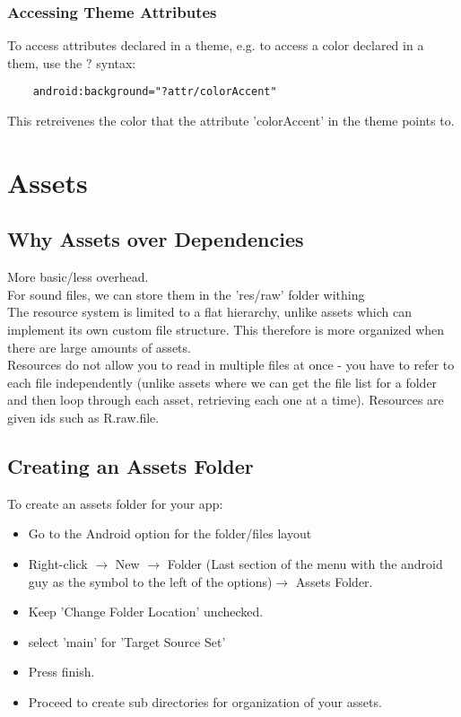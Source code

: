 \documentclass[]{article}
\begin{document}
\subsubsection{Accessing Theme Attributes}
To access attributes declared in a theme, e.g. to access a color declared in a them, use the $ ? $ syntax:
\begin{lstlisting}
	android:background="?attr/colorAccent"
\end{lstlisting}
This retreivenes the color that the attribute 'colorAccent' in the theme points to.

\section{Assets}
\subsection{Why Assets over Dependencies}
More basic/less overhead.
\\
For sound files, we can store them in the 'res/raw' folder withing 
\\
The resource system is limited to a flat hierarchy, unlike assets which can implement its own custom file structure.  This therefore is more organized when there are large amounts of assets.
\\
Resources do not allow you to read in multiple files at once - you have to refer to each file independently (unlike assets where we can get the file list for a folder and then  loop through each asset, retrieving each one at a time).  Resources are given ids such as R.raw.file.


\subsection{Creating an Assets Folder}
To create an assets folder for your app:
\begin{itemize}
	\item Go to the Android option for the folder/files layout 
	\item Right-click $\rightarrow$ New $\rightarrow$ Folder (Last section of the menu with the android guy as the symbol to the left of the options)$\rightarrow$ Assets Folder.
	\item Keep 'Change Folder Location' unchecked.
	\item select 'main' for 'Target Source Set'
	\item Press finish.
	\item Proceed to create sub directories for organization of your assets.
\end{itemize}
\end{document}
